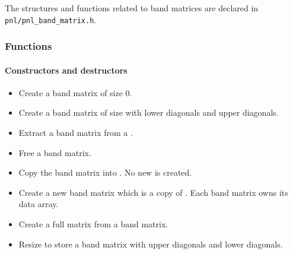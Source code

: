 The structures and functions related to band matrices are declared in
\verb!pnl/pnl_band_matrix.h!. 


\subsubsection{Functions}
\paragraph{Constructors and destructors}
\begin{itemize}
  \item {}
  \sshortdescribe Create a band matrix of size 0.

\item {}
  \sshortdescribe Create a band matrix of size  with  lower
  diagonals and  upper diagonals.

\item {}
  \sshortdescribe Extract a band matrix from a \PnlMat.

\item {}
  \sshortdescribe Free a band matrix.

\item {}
  \sshortdescribe Copy the band matrix  into . No new
  \PnlBandMat is created.

\item {}
  \sshortdescribe Create a new band matrix which is a copy of . Each
  band matrix owns its data array.

\item {}
  \sshortdescribe Create a full matrix from a band matrix.

\item {}
  \sshortdescribe Resize  to store a  band matrix with
   upper diagonals and  lower diagonals.
\end{itemize}

